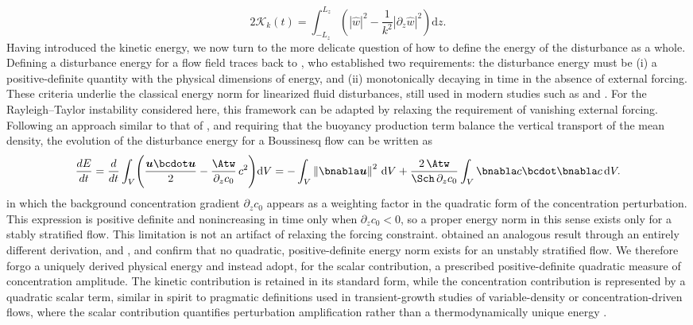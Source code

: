 \begin{equation}
    \label{eq:bq_kinetic_energy_reduced_dz_k}
    2\mathcal{K}_k(t) = \int_{-L_z}^{L_z}\left(|\hat{w}|^{2} - \frac{1}{k^{2}}\left|\partial_{z}\hat{w}\right|^{2}\right)\mathrm{d}z.
\end{equation}
Having introduced the kinetic energy, we now turn to the more delicate question of how to define the energy of the disturbance as a whole. Defining a disturbance energy for a flow field traces back to \citet{chu-1965}, who established two requirements: the disturbance energy must be (i) a positive-definite quantity with the physical dimensions of energy, and (ii) monotonically decaying in time in the absence of external forcing. These criteria underlie the classical energy norm for linearized fluid disturbances, still used in modern studies such as \citet{schmidt-et-al-2018} and \citet{towne-schmidt-colonious-2018}. For the Rayleigh--Taylor instability considered here, this framework can be adapted by relaxing the requirement of vanishing external forcing. Following an approach similar to that of \citet{hanifi-schmidt-henningson-1996}, and requiring that the buoyancy production term balance the vertical transport of the mean density, the evolution of the disturbance energy for a Boussinesq flow can be written as
\begin{equation}
  \frac{dE}{dt}
  = \frac{d}{dt}\int_{V}
    \Biggl(
      \frac{\boldsymbol{u}\bcdot\boldsymbol{u}}{2}
      - \frac{\Atw}{\partial_{z}c_{0}}\,c^{2}
    \Biggr)\mathrm{d}V
  = -\int_{V}
      \left\|\bnabla\boldsymbol{u}\right\|^{2}\,\mathrm{d}V
    + \frac{2\,\Atw}{\Sch\,\partial_{z}c_{0}}\int_{V}
      \bnabla c\bcdot\bnabla c\,\mathrm{d}V.
  \label{eq:energy_evolution}
\end{equation}
in which the background concentration gradient \(\partial_{z}c_{0}\) appears as a weighting factor in the quadratic form of the concentration perturbation. This expression is positive definite and nonincreasing in time only when \(\partial_{z}c_{0}<0\), so a proper energy norm in this sense exists only for a stably stratified flow. This limitation is not an artifact of relaxing the forcing constraint. \citet{holliday-mcintyre-1981} obtained an analogous result through an entirely different derivation, and \citet{shepherd-1993}, \citet{winters-et-al-1995} and \citet{roullet-klein-2009} confirm that no quadratic, positive-definite energy norm exists for an unstably stratified flow. We therefore forgo a uniquely derived physical energy and instead adopt, for the scalar contribution, a prescribed positive-definite quadratic measure of concentration amplitude. The kinetic contribution is retained in its standard form, while the concentration contribution is represented by a quadratic scalar term, similar in spirit to pragmatic definitions used in transient-growth studies of variable-density or concentration-driven flows, where the scalar contribution quantifies perturbation amplification rather than a thermodynamically unique energy \citep{don-nils-amir-2013}.

